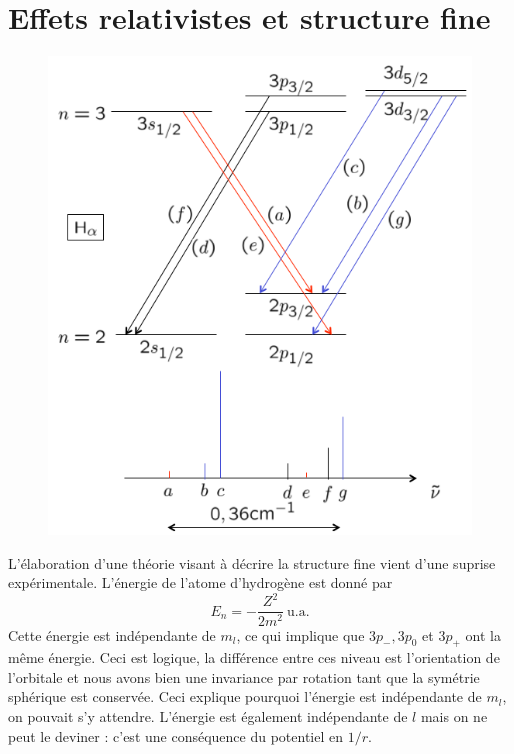 \section{Effets relativistes et structure fine}
	\begin{figure}
	\vspace{-8mm}
	\includegraphics[scale=0.4]{ch1/image8}
	\end{figure}
L'élaboration d'une théorie visant à décrire la structure fine vient d'une suprise expérimentale. L'énergie de
l'atome d'hydrogène est donné par
\begin{equation}
E_n = -\frac{Z^2}{2m^2}\ \text{u.a.}
\end{equation}
Cette énergie est indépendante de $m_l$, ce qui implique que $3p_-, 3p_0$ et $3p_+$ ont la même énergie. Ceci
est logique, la différence entre ces niveau est l’orientation de l'orbitale et nous avons bien une invariance
par rotation tant que la symétrie sphérique est conservée. Ceci explique pourquoi l'énergie est indépendante
de $m_l$, on pouvait s'y attendre. L'énergie est également indépendante de $l$ mais on ne peut le deviner : 
c'est une conséquence du potentiel en $1/r$.\\

